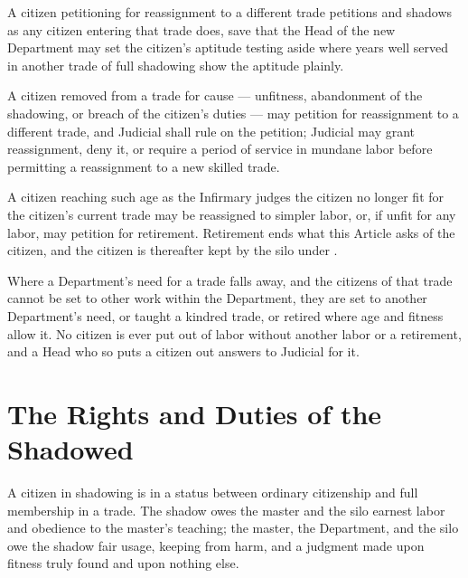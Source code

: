 \begin{clauses}
\item A citizen petitioning for reassignment to a different trade petitions and shadows as any citizen entering that trade does, save that the Head of the new Department may set the citizen's aptitude testing aside where years well served in another trade of full shadowing show the aptitude plainly.
\item A citizen removed from a trade for cause --- unfitness, abandonment of the shadowing, or breach of the citizen's duties --- may petition for reassignment to a different trade, and Judicial shall rule on the petition; Judicial may grant reassignment, deny it, or require a period of service in mundane labor before permitting a reassignment to a new skilled trade.
\item A citizen reaching such age as the Infirmary judges the citizen no longer fit for the citizen's current trade may be reassigned to simpler labor, or, if unfit for any labor, may petition for retirement. Retirement ends what this Article asks of the citizen, and the citizen is thereafter kept by the silo under .
\item Where a Department's need for a trade falls away, and the citizens of that trade cannot be set to other work within the Department, they are set to another Department's need, or taught a kindred trade, or retired where age and fitness allow it. No citizen is ever put out of labor without another labor or a retirement, and a Head who so puts a citizen out answers to Judicial for it.
\end{clauses}

\section{The Rights and Duties of the Shadowed}
\label{sec:labor:rights-and-duties-of-the-shadowed}

A citizen in shadowing is in a status between ordinary citizenship and full membership in a trade. The shadow owes the master and the silo earnest labor and obedience to the master's teaching; the master, the Department, and the silo owe the shadow fair usage, keeping from harm, and a judgment made upon fitness truly found and upon nothing else.

